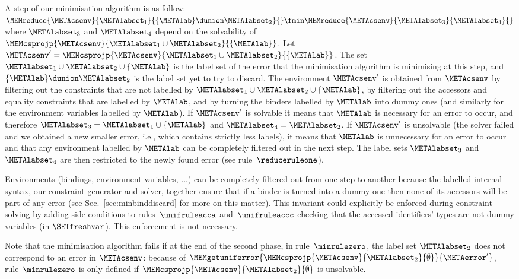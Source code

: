 \documentclass{jfp1}
\begin{document}
A step of our minimisation algorithm is as follow:
$\MEMreduce{\METAcsenv}{\METAlabset_1}{\{\METAlab\}\dunion\METAlabset_2}{}
\fmin
\MEMreduce{\METAcsenv}{\METAlabset_3}{\METAlabset_4}{}$
where $\METAlabset_3$ and $\METAlabset_4$ depend on the solvability of
$\MEMcsprojp{\METAcsenv}{\METAlabset_1\cup\METAlabset_2}{\{\METAlab\}}$.
Let
$\METAcsenv'=\MEMcsprojp{\METAcsenv}{\METAlabset_1\cup\METAlabset_2}{\{\METAlab\}}$.
The set $\METAlabset_1\cup\METAlabset_2\cup\{\METAlab\}$ is the label
set of the error that the minimisation algorithm is minimising at this
step,
and $\{\METAlab\}\dunion\METAlabset_2$ is the label set yet to try to
discard.
%
The environment $\METAcsenv'$ is obtained from $\METAcsenv$ by
filtering out the constraints that are not labelled by
$\METAlabset_1\cup\METAlabset_2\cup\{\METAlab\}$, by filtering out the
accessors and equality constraints that are labelled by $\METAlab$,
and by turning the binders labelled by $\METAlab$ into dummy ones (and
similarly for the environment variables labelled by $\METAlab$).
%
If $\METAcsenv'$ is solvable it means that $\METAlab$ is necessary for
an error to occur, and therefore
$\METAlabset_3=\METAlabset_1\cup\{\METAlab\}$ and
$\METAlabset_4=\METAlabset_2$.  If $\METAcsenv'$ is unsolvable (the
solver failed and we obtained a new smaller error, i.e., which
contains strictly less labels), it means that
$\METAlab$ is unnecessary for an error to occur and that any
environment labelled by $\METAlab$ can be completely filtered out in
the next step.  The label sets $\METAlabset_3$ and $\METAlabset_4$ are
then restricted to the newly found error (see rule~$\reduceruleone$).


Environments (bindings, environment variables, ...) can be completely
filtered out from one step to another because the labelled internal
syntax, our constraint generator and solver, together ensure that if a
binder is turned into a dummy one then none of its accessors will be
part of any error (see Sec.~\ref{sec:minbinddiscard} for more on this
matter).  This invariant could explicitly be enforced during
constraint solving by adding side conditions to rules~$\unifruleacca$
and~$\unifruleaccc$ checking that the accessed identifiers' types are
not dummy variables (in $\SETfreshvar$).  This enforcement is not
necessary.

Note that the minimisation algorithm fails if at the end of the second
phase, in rule~$\minrulezero$, the label set $\METAlabset_2$ does not
correspond to an error in $\METAcsenv$: because of
$\MEMgetuniferror{\MEMcsprojp{\METAcsenv}{\METAlabset_2}{\emptyset}}{\METAerror'}$,
rule~$\minrulezero$ is only defined if
$\MEMcsprojp{\METAcsenv}{\METAlabset_2}{\emptyset}$ is unsolvable.
\end{document}
